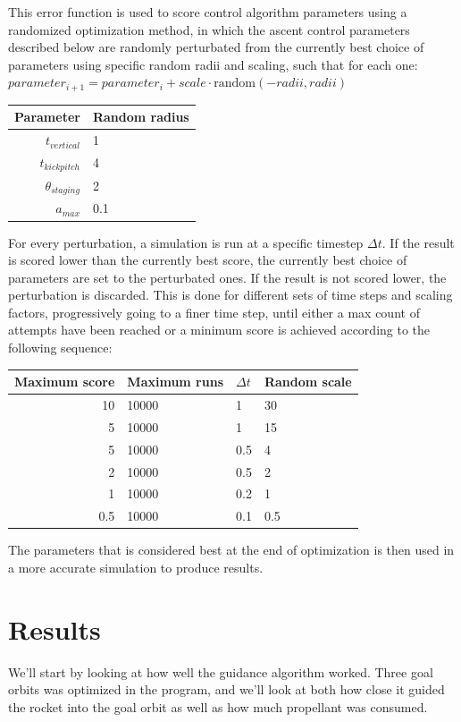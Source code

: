 \documentclass[11pt]{article}
\begin{document}
This error function is used to score control algorithm parameters using a randomized optimization method, in which the ascent control parameters described below 
are randomly perturbated from the currently best choice of parameters using specific random radii and scaling, such that for each one: $parameter_{i+1} = parameter_{i} + scale \cdot \text{random}(-radii, radii)$
\begin{center}
  \begin{tabular}{ r | l  }
    Parameter & Random radius \\
    \hline
    $t_{vertical}$ & 1 \\
    $t_{kickpitch}$ & 4 \\
    $\theta_{staging}$ & 2 \\
    $a_{max}$ & 0.1 \\
  \end{tabular}
\end{center}

For every perturbation, a simulation is run at a specific timestep $\Delta t$. If the result is scored lower than the currently best score, the currently best choice of parameters are set to
the perturbated ones.
If the result is not scored lower, the perturbation is discarded.
This is done for different sets of time steps and scaling factors, progressively going to a finer time step, until either a max count of attempts have been reached or a minimum score is achieved according to the following sequence:
\begin{center}
  \begin{tabular}{ r | l | l | l  }
    Maximum score & Maximum runs & $\Delta t$ & Random scale \\
    \hline
    10 & 10000 & 1 & 30 \\
    5 & 10000 & 1 & 15 \\
    5 & 10000 & 0.5 & 4 \\
    2 & 10000 & 0.5 & 2 \\
    1 & 10000 & 0.2 & 1 \\
    0.5 & 10000 & 0.1 & 0.5 \\
  \end{tabular}
\end{center}

The parameters that is considered best at the end of optimization is then used in a more accurate simulation to produce results.

\section{Results}
We'll start by looking at how well the guidance algorithm worked. Three goal orbits was optimized in the program, and we'll look at both how close it guided the rocket into the goal orbit as well as how much propellant was consumed.
\end{document}

